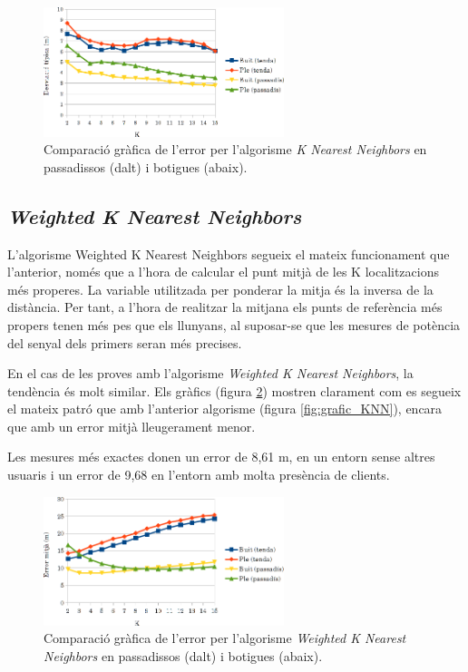 \begin{figure}[ht]
\begin{center}
\includegraphics[width=7cm]{imatges/knn_desviacio.png}
\caption{Comparació gràfica de l'error per l'algorisme \textit{K Nearest Neighbors} en passadissos (dalt) i botigues (abaix).}
\label{fig:grafic_desviacio_KNN}
\end{center}
\end{figure}

\subsection{\textit{Weighted K Nearest Neighbors}}

L'algorisme Weighted K Nearest Neighbors segueix el mateix funcionament que l'anterior, només que a l'hora de calcular el punt mitjà de les K localitzacions més properes. La variable utilitzada per ponderar la mitja és la inversa de la distància. Per tant, a l'hora de realitzar la mitjana els punts de referència més propers tenen més pes que els llunyans, al suposar-se que les mesures de potència del senyal dels primers seran més precises.

En el cas de les proves amb l'algorisme \textit{Weighted K Nearest Neighbors}, la tendència és molt similar. Els gràfics (figura \ref{fig:grafic_mitja_WKNN}) mostren clarament com es segueix el mateix patró que amb l'anterior algorisme (figura \ref{fig:grafic_KNN}), encara que amb un error mitjà lleugerament menor.

Les mesures més exactes donen un error de 8,61 m, en un entorn sense altres usuaris i un error de 9,68 en l'entorn amb molta presència de clients.

\begin{figure}[ht]
\begin{center}
\includegraphics[width=7cm]{imatges/wknn_mitja.png}
\caption{Comparació gràfica de l'error per l'algorisme \textit{Weighted K Nearest Neighbors} en passadissos (dalt) i botigues (abaix).}
\label{fig:grafic_mitja_WKNN}
\end{center}
\end{figure}

